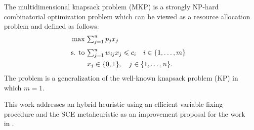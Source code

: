 The multidimensional knapsack problem (MKP) is a strongly NP-hard combinatorial
optimization problem which can be viewed as a resource allocation problem and
defined as follows:
\vspace{-15pt}
\begin{align*}
    \text{max} ~ & {\textstyle \sum_{j=1}^n p_j x_j} \\[3pt]
    \text{s. to} ~ & {\textstyle \sum_{j=1}^n w_{ij} x_j \leqslant c_i \quad i \in \{1, \ldots, m\}}\\
   & x_j \in \{0, 1\}, \quad j \in \{1, \ldots, n\}.
\end{align*}
The problem is a generalization of the well-known knapsack problem (KP) in which
$m = 1$.

This work addresses an hybrid heuristic using an
efficient variable fixing procedure and the SCE metaheuristic as an improvement
proposal for the work in \cite{baroni2015shuffled}.
